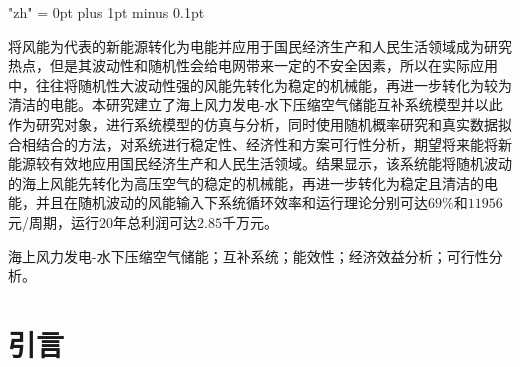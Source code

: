 \documentclass{jnuthesis}
\begin{document}
	\fontsize{10.5bp}{24pt}
	\renewcommand{\biaoti}{海上风力发电-水下压缩空气储能互补系统建模仿真与经济效益分析} 
	\renewcommand{\xingming}{余思贤、周允康、何婷}
	\XeTeXlinebreaklocale "zh"
	\XeTeXlinebreakskip = 0pt plus 1pt minus 0.1pt
	
	
	
	
	\titlepage
	\begin{zhabstract}
		\zhaiyao 将风能为代表的新能源转化为电能并应用于国民经济生产和人民生活领域成为研究热点，但是其波动性和随机性会给电网带来一定的不安全因素，所以在实际应用中，往往将随机性大波动性强的风能先转化为稳定的机械能，再进一步转化为较为清洁的电能。本研究建立了海上风力发电-水下压缩空气储能互补系统模型并以此作为研究对象，进行系统模型的仿真与分析，同时使用随机概率研究和真实数据拟合相结合的方法，对系统进行稳定性、经济性和方案可行性分析，期望将来能将新能源较有效地应用国民经济生产和人民生活领域。结果显示，该系统能将随机波动的海上风能先转化为高压空气的稳定的机械能，再进一步转化为稳定且清洁的电能，并且在随机波动的风能输入下系统循环效率和运行理论分别可达$ 69\% $和$ 11956 $元/周期，运行$ 20 $年总利润可达$ 2.85 $千万元。
		
		\guanjianci 海上风力发电-水下压缩空气储能；互补系统；能效性；经济效益分析；可行性分析。
		
	\end{zhabstract}
	\chapter{引言}
	
\end{document}
